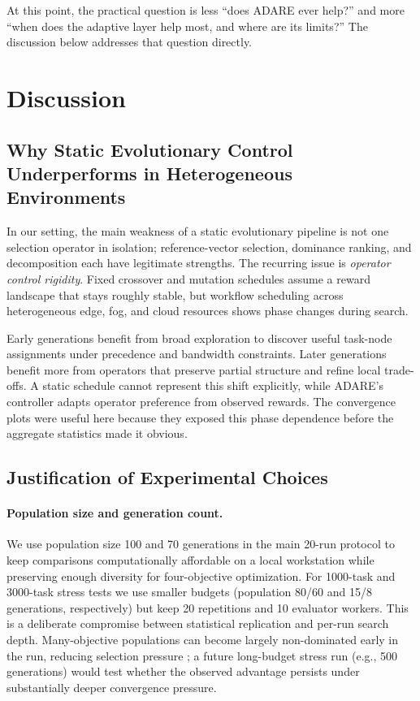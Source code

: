 \documentclass[runningheads]{llncs}
\begin{document}
At this point, the practical question is less ``does ADARE ever help?'' and more ``when does the adaptive layer help most, and where are its limits?'' The discussion below addresses that question directly.
\section{Discussion}
\subsection{Why Static Evolutionary Control Underperforms in Heterogeneous Environments}
In our setting, the main weakness of a static evolutionary pipeline is not one selection operator in isolation; reference-vector selection, dominance ranking, and decomposition each have legitimate strengths. The recurring issue is \emph{operator control rigidity}. Fixed crossover and mutation schedules assume a reward landscape that stays roughly stable, but workflow scheduling across heterogeneous edge, fog, and cloud resources shows phase changes during search.

Early generations benefit from broad exploration to discover useful task-node assignments under precedence and bandwidth constraints. Later generations benefit more from operators that preserve partial structure and refine local trade-offs. A static schedule cannot represent this shift explicitly, while ADARE's controller adapts operator preference from observed rewards. The convergence plots were useful here because they exposed this phase dependence before the aggregate statistics made it obvious.
\subsection{Justification of Experimental Choices}
\paragraph{Population size and generation count.}
We use population size 100 and 70 generations in the main 20-run protocol to keep comparisons computationally affordable on a local workstation while preserving enough diversity for four-objective optimization. For 1000-task and 3000-task stress tests we use smaller budgets (population 80/60 and 15/8 generations, respectively) but keep 20 repetitions and 10 evaluator workers. This is a deliberate compromise between statistical replication and per-run search depth. Many-objective populations can become largely non-dominated early in the run, reducing selection pressure \cite{purshouse2007many}; a future long-budget stress run (e.g., 500 generations) would test whether the observed advantage persists under substantially deeper convergence pressure.
\end{document}
